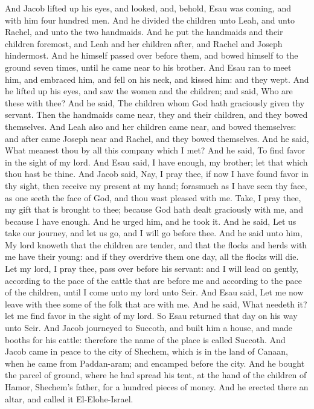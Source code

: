 And Jacob lifted up his eyes, and looked, and, behold, Esau was coming, and with him four hundred men. And he divided the children unto Leah, and unto Rachel, and unto the two handmaids. And he put the handmaids and their children foremost, and Leah and her children after, and Rachel and Joseph hindermost. And he himself passed over before them, and bowed himself to the ground seven times, until he came near to his brother. And Esau ran to meet him, and embraced him, and fell on his neck, and kissed him: and they wept. And he lifted up his eyes, and saw the women and the children; and said, Who are these with thee? And he said, The children whom God hath graciously given thy servant. Then the handmaids came near, they and their children, and they bowed themselves. And Leah also and her children came near, and bowed themselves: and after came Joseph near and Rachel, and they bowed themselves. And he said, What meanest thou by all this company which I met? And he said, To find favor in the sight of my lord. And Esau said, I have enough, my brother; let that which thou hast be thine. And Jacob said, Nay, I pray thee, if now I have found favor in thy sight, then receive my present at my hand; forasmuch as I have seen thy face, as one seeth the face of God, and thou wast pleased with me. Take, I pray thee, my gift that is brought to thee; because God hath dealt graciously with me, and because I have enough. And he urged him, and he took it. And he said, Let us take our journey, and let us go, and I will go before thee. And he said unto him, My lord knoweth that the children are tender, and that the flocks and herds with me have their young: and if they overdrive them one day, all the flocks will die. Let my lord, I pray thee, pass over before his servant: and I will lead on gently, according to the pace of the cattle that are before me and according to the pace of the children, until I come unto my lord unto Seir. And Esau said, Let me now leave with thee some of the folk that are with me. And he said, What needeth it? let me find favor in the sight of my lord. So Esau returned that day on his way unto Seir. And Jacob journeyed to Succoth, and built him a house, and made booths for his cattle: therefore the name of the place is called Succoth.  And Jacob came in peace to the city of Shechem, which is in the land of Canaan, when he came from Paddan-aram; and encamped before the city. And he bought the parcel of ground, where he had spread his tent, at the hand of the children of Hamor, Shechem’s father, for a hundred pieces of money. And he erected there an altar, and called it El-Elohe-Israel. 

